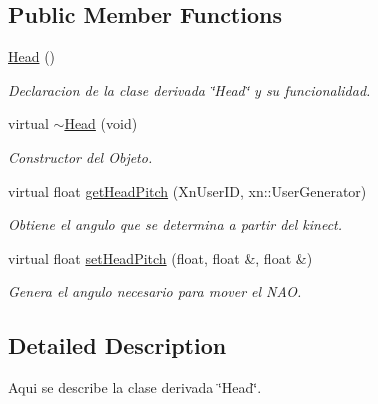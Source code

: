 \subsection*{Public Member Functions}
\begin{DoxyCompactItemize}
\item 
\hypertarget{class_head_a0a4e931e188a25b60f6b992ff32f7bfa}{\hyperlink{class_head_a0a4e931e188a25b60f6b992ff32f7bfa}{Head} ()}\label{class_head_a0a4e931e188a25b60f6b992ff32f7bfa}

\begin{DoxyCompactList}\small\item\em Declaracion de la clase derivada \char`\"{}\-Head\char`\"{} y su funcionalidad. \end{DoxyCompactList}\item 
\hypertarget{class_head_a502987ba6c8d6b615977150dd565fc27}{virtual \hyperlink{class_head_a502987ba6c8d6b615977150dd565fc27}{$\sim$\-Head} (void)}\label{class_head_a502987ba6c8d6b615977150dd565fc27}

\begin{DoxyCompactList}\small\item\em Constructor del Objeto. \end{DoxyCompactList}\item 
virtual float \hyperlink{class_head_ad57a93c84de0a6681dce1dbcdc87823c}{get\-Head\-Pitch} (Xn\-User\-I\-D, xn\-::\-User\-Generator)
\begin{DoxyCompactList}\small\item\em Obtiene el angulo que se determina a partir del kinect. \end{DoxyCompactList}\item 
\hypertarget{class_head_a6f624a1b326a840aad5221608809f40f}{virtual float \hyperlink{class_head_a6f624a1b326a840aad5221608809f40f}{set\-Head\-Pitch} (float, float \&, float \&)}\label{class_head_a6f624a1b326a840aad5221608809f40f}

\begin{DoxyCompactList}\small\item\em Genera el angulo necesario para mover el N\-A\-O. \end{DoxyCompactList}\end{DoxyCompactItemize}


\subsection{Detailed Description}
Aqui se describe la clase derivada \char`\"{}\-Head\char`\"{}. 

